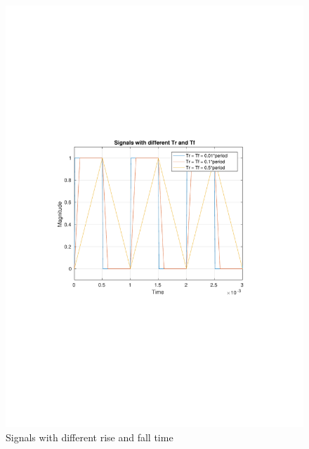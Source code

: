 \documentclass[12pt,a4paper,UKenglish]{article}
\begin{document}
\begin{figure} [htbp]
  \centering 
  \includegraphics[width=\textwidth]{img/2b_tran.pdf} 
  \caption{Signals with different rise and fall time}
  \label{tran_all} 
\end{figure}
\end{document}
